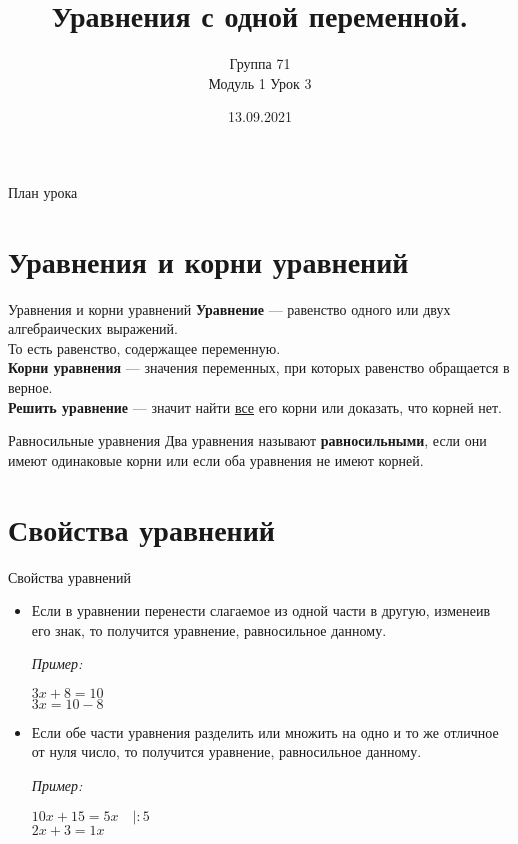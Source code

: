 \documentclass[12pt, aspectratio=169]{beamer}
\title{Уравнения с одной переменной.}
\subtitle{Группа 71 \\[8pt] Модуль 1 Урок 3}
\institute{Школа Симметрия}
\date{13.09.2021}
\begin{document}
\maketitle
\begin{frame}{План урока}
\end{frame}

\section{Уравнения и корни уравнений}

\begin{frame}{Уравнения и корни уравнений}
	\onslide<1->
	\textbf{Уравнение} — равенство одного или двух алгебраических выражений.\\
	То есть равенство, содержащее переменную.\\[1em]
	\onslide<2->
	\textbf{Корни уравнения} — значения переменных, при которых равенство обращается в верное.\\[1em]
	\onslide<3->
	\textbf{Решить уравнение} — значит найти \underline{все} его корни или доказать, что корней нет.
\end{frame}

\begin{frame}{Равносильные уравнения}
	Два уравнения называют \textbf{равносильными}, если они имеют одинаковые корни или если оба уравнения не имеют корней.
\end{frame}

\section{Свойства уравнений}

\begin{frame}{Свойства уравнений}
	\begin{itemize}
		\item<1-> {
			Если в уравнении перенести слагаемое из одной части в другую, изменеив его знак, то получится уравнение, равносильное данному.
			
			\textit{Пример:}
			\begin{center}
				$3x+8=10$\\
				$3x=10-8$
			\end{center}
		}
		\item<2-> {
			Если обе части уравнения разделить или множить на одно и то же отличное от нуля число, то получится уравнение, равносильное данному.
			
			\textit{Пример:}
			\begin{center}
				$10x+15=5x\quad|:5 $\\
				$2x+3=1x$
			\end{center}
		}
	\end{itemize}
\end{frame}
\end{document}
